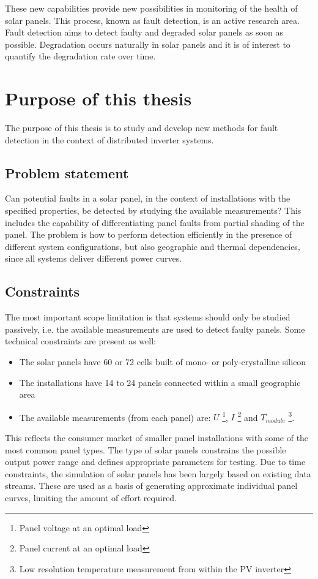 These new capabilities provide new possibilities in monitoring of the health of solar panels.
This process, known as fault detection, is an active research area.
Fault detection aims to detect faulty and degraded solar panels as soon as possible. 
Degradation occurs naturally in solar panels and it is of interest to quantify the degradation rate over time.

\section{Purpose of this thesis}
The purpose of this thesis is to study and develop new methods for fault detection in the context of distributed inverter systems.

\subsection*{Problem statement}
Can potential faults in a solar panel, in the context of installations with the specified properties, be detected by studying the available measurements?
This includes the capability of differentiating panel faults from partial shading of the panel.
The problem is how to perform detection efficiently in the presence of different system configurations, but also geographic and thermal dependencies, since all systems deliver different power curves.

\subsection*{Constraints}
The most important scope limitation is that systems should only be studied passively, i.e. the available measurements are used to detect faulty panels.  
Some technical constraints are present as well:
\begin{itemize}
\item The solar panels have 60 or 72 cells built of mono- or poly-crystalline silicon
\item The installations have 14 to 24 panels connected within a small geographic area
\item The available measurements (from each panel) are:
$U$ \footnote{Panel voltage at an optimal load},
$I$ \footnote{Panel current at an optimal load} and
$T_{module}$ \footnote{Low resolution temperature measurement from within the PV inverter}.

\end{itemize}

This reflects the consumer market of smaller panel installations with some of the most common panel types.
The type of solar panels constrains the possible output power range and defines appropriate parameters for testing.
Due to time constraints, the simulation of solar panels has been largely based on existing data streams.
These are used as a basis of generating approximate individual panel curves, limiting the amount of effort required.

